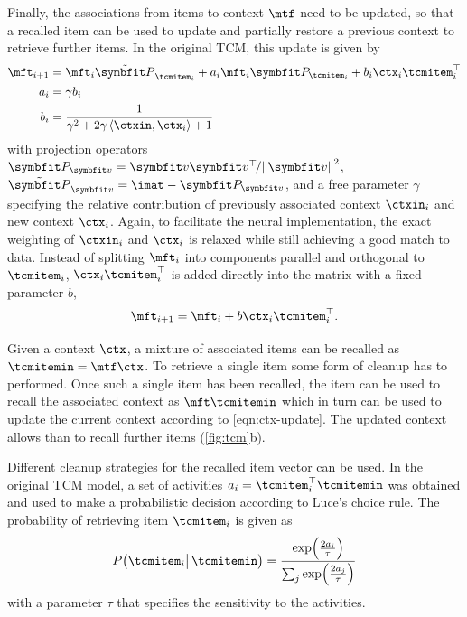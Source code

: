 Finally, the associations from items to context $\mtf$ need to be updated, so that a recalled item can be used to update and partially restore a previous context to retrieve further items.
In the original TCM, this update is given by
\begin{align}
    \mft_{i+1} &= \mft_i \tilde{\mat{P}}_{\tcmitem_i} + a_i \mft_i \mat{P}_{\tcmitem_i} + b_i \ctx_i \tcmitem_i\Tr \\
    a_i &= \gamma b_i \\
    b_i &= \frac{1}{\gamma^2 + 2 \gamma \left\langle\ctxin, \ctx_i\right\rangle + 1}
\end{align}
with projection operators $\mat{P}_{\vc v} = \vc v \vc v\Tr\!/ \norm{\vc v}^2$, $\tilde{\mat{P}}_{\vc v} = \imat - \mat{P}_{\vc v}$, and a free parameter $\gamma$ specifying the relative contribution of previously associated context $\ctxin_i$ and new context $\ctx_i$.
Again, to facilitate the neural implementation, the exact weighting of $\ctxin_i$ and $\ctx_i$ is relaxed while still achieving a good match to data.
Instead of splitting $\mft_i$ into components parallel and orthogonal to $\tcmitem_i$, $\ctx_i\tcmitem_i\Tr$ is added directly into the matrix with a fixed parameter $b$,
\begin{equation}
    \mft_{i+1} = \mft_i + b \ctx_i\tcmitem_i\Tr\text{.}
\end{equation}

Given a context $\ctx$, a mixture of associated items can be recalled as $\tcmitemin = \mtf \ctx$.
To retrieve a single item some form of cleanup has to performed.
Once such a single item has been recalled, the item can be used to recall the associated context as $\mft \tcmitemin$ which in turn can be used to update the current context according to \cref{eqn:ctx-update}.
The updated context allows than to recall further items (\cref{fig:tcm}b).

Different cleanup strategies for the recalled item vector can be used.
In the original TCM model, a set of activities $a_i = \tcmitem_i\Tr \tcmitemin$ was obtained and used to make a probabilistic decision according to Luce's choice rule.
The probability of retrieving item $\tcmitem_i$ is given as
\begin{equation}
    P\bigl(\tcmitem_i \bigl|\,\tcmitemin\bigr) = \frac{\exp\!\del{\frac{2a_i}{\tau}}}{\sum_j \exp\!\del{\frac{2a_j}{\tau}}}
\end{equation}
with a parameter $\tau$ that specifies the sensitivity to the activities.

